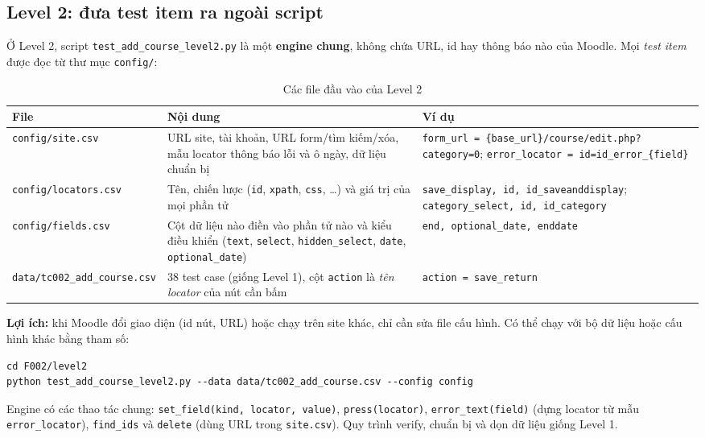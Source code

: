 \subsection{Level 2: đưa test item ra ngoài script}
Ở Level 2, script \texttt{test\_add\_course\_level2.py} là một \textbf{engine chung}, không chứa URL, id hay thông báo nào của Moodle.
Mọi \textit{test item} được đọc từ thư mục \texttt{config/}:
\begin{table}[H]
\centering\footnotesize
\begin{tabular}{|l|L{5.4cm}|L{6.2cm}|}
\hline
{}\textbf{File} & \textbf{Nội dung} & \textbf{Ví dụ} \\ \hline
\texttt{config/site.csv} & URL site, tài khoản, URL form/tìm kiếm/xóa, mẫu locator thông báo lỗi và ô ngày, dữ liệu chuẩn bị &
  \texttt{form\_url = \{base\_url\}/course/edit.php?category=0}; \texttt{error\_locator = id=id\_error\_\{field\}} \\ \hline
\texttt{config/locators.csv} & Tên, chiến lược (\texttt{id}, \texttt{xpath}, \texttt{css}, \dots) và giá trị của mọi phần tử &
  \texttt{save\_display, id, id\_saveanddisplay}; \texttt{category\_select, id, id\_category} \\ \hline
\texttt{config/fields.csv} & Cột dữ liệu nào điền vào phần tử nào và kiểu điều khiển (\texttt{text}, \texttt{select}, \texttt{hidden\_select}, \texttt{date}, \texttt{optional\_date}) &
  \texttt{end, optional\_date, enddate} \\ \hline
\texttt{data/tc002\_add\_course.csv} & 38 test case (giống Level 1), cột \texttt{action} là \emph{tên locator} của nút cần bấm & \texttt{action = save\_return} \\ \hline
\end{tabular}
\caption{Các file đầu vào của Level 2}
\end{table}
\textbf{Lợi ích:} khi Moodle đổi giao diện (id nút, URL) hoặc chạy trên site khác, chỉ cần sửa file cấu hình. Có thể chạy với
bộ dữ liệu hoặc cấu hình khác bằng tham số:
\begin{lstlisting}
cd F002/level2
python test_add_course_level2.py --data data/tc002_add_course.csv --config config
\end{lstlisting}
Engine có các thao tác chung: \texttt{set\_field(kind, locator, value)}, \texttt{press(locator)}, \texttt{error\_text(field)}
(dựng locator từ mẫu \texttt{error\_locator}), \texttt{find\_ids} và \texttt{delete} (dùng URL trong \texttt{site.csv}).
Quy trình verify, chuẩn bị và dọn dữ liệu giống Level 1.

